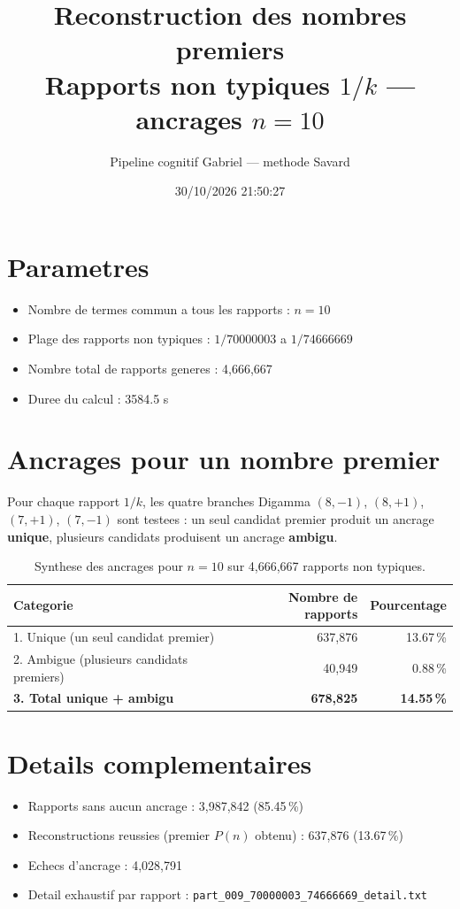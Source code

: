 \documentclass[12pt]{article}
\title{Reconstruction des nombres premiers\\Rapports non typiques $1/k$ --- ancrages $n=10$
}
\author{Pipeline cognitif Gabriel --- methode Savard}
\date{30/10/2026 21:50:27}
\begin{document}
\maketitle

\section*{Parametres}
\begin{itemize}
\item Nombre de termes commun a tous les rapports : $n=10$
\item Plage des rapports non typiques : $1/70000003$ a $1/74666669$
\item Nombre total de rapports generes : 4,666,667
\item Duree du calcul : 3584.5 s
\end{itemize}

\section*{Ancrages pour un nombre premier}

Pour chaque rapport $1/k$, les quatre branches Digamma $(8,-1)$, $(8,+1)$, $(7,+1)$, $(7,-1)$ sont testees : un seul candidat premier produit un ancrage \textbf{unique}, plusieurs candidats produisent un ancrage \textbf{ambigu}.

\begin{table}[h!]
\centering
\caption{Synthese des ancrages pour $n=10$ sur 4,666,667 rapports non typiques.}
\begin{tabular}{lrr}
\toprule
\textbf{Categorie} & \textbf{Nombre de rapports} & \textbf{Pourcentage} \\
\midrule
1. Unique (un seul candidat premier) & 637,876 & 13.67\,\% \\
2. Ambigue (plusieurs candidats premiers) & 40,949 & 0.88\,\% \\
\midrule
\textbf{3. Total unique + ambigu} & \textbf{678,825} & \textbf{14.55\,\%} \\
\bottomrule
\end{tabular}
\end{table}

\section*{Details complementaires}
\begin{itemize}
\item Rapports sans aucun ancrage : 3,987,842 (85.45\,\%)
\item Reconstructions reussies (premier $P(n)$ obtenu) : 637,876 (13.67\,\%)
\item Echecs d'ancrage : 4,028,791
\item Detail exhaustif par rapport : \texttt{part_009_70000003_74666669_detail.txt}
\end{itemize}
\end{document}
